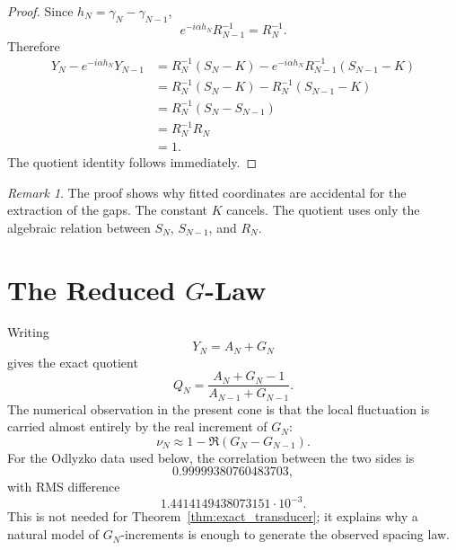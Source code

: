 \documentclass[11pt]{amsart}
\numberwithin{equation}{section}
\theoremstyle{plain}
\theoremstyle{definition}
\theoremstyle{remark}
\newtheorem{remark}[theorem]{Remark}
\begin{document}
\begin{proof}
Since $h_N=\gamma_N-\gamma_{N-1}$,
\begin{equation}
e^{-i\alpha h_N}R_{N-1}^{-1}=R_N^{-1}.
\label{eq:phase_shift_identity}
\end{equation}
Therefore
\begin{align}
Y_N-e^{-i\alpha h_N}Y_{N-1}
&=R_N^{-1}(S_N-K)-e^{-i\alpha h_N}R_{N-1}^{-1}(S_{N-1}-K)
\label{eq:telescoping_step_one}\\
&=R_N^{-1}(S_N-K)-R_N^{-1}(S_{N-1}-K)
\label{eq:telescoping_step_two}\\
&=R_N^{-1}(S_N-S_{N-1})
\label{eq:telescoping_step_three}\\
&=R_N^{-1}R_N
\label{eq:telescoping_step_four}\\
&=1.
\label{eq:telescoping_step_five}
\end{align}
The quotient identity follows immediately.
\end{proof}

\begin{remark}
\label{rem:fitted_coordinates}
The proof shows why fitted coordinates are accidental for the extraction of the gaps. The constant $K$ cancels. The quotient uses only the algebraic relation between $S_N$, $S_{N-1}$, and $R_N$.
\end{remark}

\section{The Reduced $G$-Law}
\label{sec:reduced_g_law}

Writing
\begin{equation}
Y_N=A_N+G_N
\label{eq:y_decomposition}
\end{equation}
gives the exact quotient
\begin{equation}
Q_N=\frac{A_N+G_N-1}{A_{N-1}+G_{N-1}}.
\label{eq:exact_reduced_quotient}
\end{equation}
The numerical observation in the present cone is that the local fluctuation is carried almost entirely by the real increment of $G_N$:
\begin{equation}
\nu_N\approx1-\Re(G_N-G_{N-1}).
\label{eq:reduced_g_law}
\end{equation}
For the Odlyzko data used below, the correlation between the two sides is
\begin{equation}
0.99999380760483703,
\label{eq:reduced_correlation}
\end{equation}
with RMS difference
\begin{equation}
1.4414149438073151\cdot10^{-3}.
\label{eq:reduced_rms}
\end{equation}
This is not needed for Theorem~\ref{thm:exact_transducer}; it explains why a natural model of $G_N$-increments is enough to generate the observed spacing law.
\end{document}
